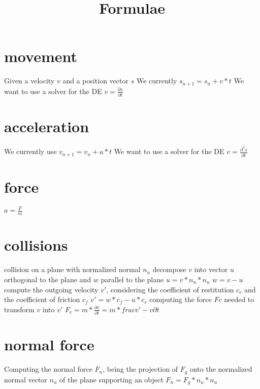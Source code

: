 \documentclass[a4paper,10pt]{article}
\title{Formulae}
\author{}
\begin{document}
\maketitle

  \begin{flushleft}
  
    \section{movement}
    Given a velocity $v$ and a position vector $s$\linebreak
    We currently $s_{n+1} = s_{n} + v*t$ \linebreak
    We want to use a solver for the DE $v = \frac{\partial s}{\partial t}$	\linebreak
    \section{acceleration}	
    We currently use $v_{n+1} = v_n + a*t$ \linebreak
    We want to use a solver for the DE $v = \frac{\partial^{2} s}{\partial t}$	\linebreak
    \section{force}
    $a = \frac{F}{m}$
    \section{collisions}
    collision on a plane with normalized normal $n_{u}$	\linebreak
    decompose $v$ into vector $u$ orthogonal to the plane and $w$ parallel to the plane	\linebreak
    $u = v * n_u * n_u$	\linebreak
    $w = v - u$	\linebreak
    compute the outgoing velocity $v'$, considering the coefficient of restitution $c_{r}$
    and the coefficient of friction $c_{f}$ \linebreak
    $v' = w*c_{f} - u*c_r$ \linebreak
    computing the force $F{c}$ needed to transform $v$ into $v'$ \linebreak
    $F_c = m * \frac{\partial v}{\partial t} = m * frac{v' - v}{\partial t}$ \linebreak
    \section{normal force}
    Computing the normal force $F_{n}$, being the projection of $F_{g}$ onto the normalized normal vector $n_{u}$ of
    the plane supporting an object\linebreak
    $F_{n} = F_{g} * n_{u} * n_{u}$ \linebreak

  \end{flushleft}
\end{document}
